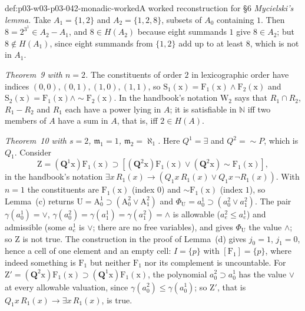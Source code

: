 \begin{hbexample}{def:p03-w03-p03-042-monadic-worked}{A worked reconstruction for \S6}
\emph{Mycielski's lemma.}  Take \(A_1=\{1,2\}\) and \(A_2=\{1,2,8\}\),
subsets of \(A_0\) containing \(1\).  Then \(8=2^{3^1}\in A_2-A_1\), and
\(8\in H(A_2)\) because eight summands \(1\) give \(8\in A_2\); but
\(8\notin H(A_1)\), since eight summands from \(\{1,2\}\) add up to at
least \(8\), which is not in \(A_1\).

\emph{Theorem~9 with \(n=2\).}  The constituents of order \(2\) in
lexicographic order have indices \((0,0),(0,1),(1,0),(1,1)\), so
\(\mathrm S_1(\mathrm x)=\mathrm F_1(\mathrm x)\wedge\mathrm F_2(\mathrm
x)\) and \(\mathrm S_2(\mathrm x)=\mathrm F_1(\mathrm x)\wedge{\sim}
\mathrm F_2(\mathrm x)\).  In the handbook's notation \(\mathrm W_2\) says
that \(R_1\cap R_2\), \(R_1-R_2\) and \(R_1\) each have a power lying in
\(A\); it is satisfiable in \(\mathbb N\) iff two members of \(A\) have a
sum in \(A\), that is, iff \(2\in H(A)\).

\emph{Theorem~10 with \(s=2\), \(\mathfrak m_1=1\), \(\mathfrak
m_2=\aleph_1\).}  Here \(Q^1=\exists\) and \(Q^2={\sim}P\), which is
\(Q_1\).  Consider
\[
 \mathrm Z=(\mathbf Q^1\mathrm x)\mathrm F_1(\mathrm x)\supset
 [(\mathbf Q^2\mathrm x)\mathrm F_1(\mathrm x)\vee(\mathbf Q^2\mathrm x)
 {\sim}\mathrm F_1(\mathrm x)],
\]
in the handbook's notation \(\exists x\,R_1(x)\to(Q_1x\,R_1(x)\lor Q_1x\,
\neg R_1(x))\).  With \(n=1\) the constituents are \(\mathrm F_1(\mathrm
x)\) (index \(0\)) and \({\sim}\mathrm F_1(\mathrm x)\) (index \(1\)), so
Lemma~(c) returns \(\mathrm U=\mathrm A^1_0\supset(\mathrm A^2_0\vee
\mathrm A^2_1)\) and \(\Phi_{\mathrm U}=a^1_0\supset(a^2_0\vee a^2_1)\).
The pair \(\gamma(a^1_0)=\vee\), \(\gamma(a^2_0)=\gamma(a^1_1)=
\gamma(a^2_1)=\wedge\) is allowable (\(a^2_e\leq a^1_e\)) and admissible
(some \(a^1_e\) is \(\vee\); there are no free variables), and gives
\(\Phi_{\mathrm U}\) the value \(\wedge\); so \(\mathrm Z\) is not true.
The construction in the proof of Lemma~(d) gives \(j_0=1\), \(j_1=0\),
hence a cell of one element and an empty cell: \(I=\{p\}\) with
\([\mathrm F_1]=\{p\}\), where indeed something is \(\mathrm F_1\) but
neither \(\mathrm F_1\) nor its complement is uncountable.  For
\(\mathrm Z'=(\mathbf Q^2\mathrm x)\mathrm F_1(\mathrm x)\supset(\mathbf
Q^1\mathrm x)\mathrm F_1(\mathrm x)\), the polynomial \(a^2_0\supset
a^1_0\) has the value \(\vee\) at every allowable valuation, since
\(\gamma(a^2_0)\leq\gamma(a^1_0)\); so \(\mathrm Z'\), that is
\(Q_1x\,R_1(x)\to\exists x\,R_1(x)\), is true.
\end{hbexample}
